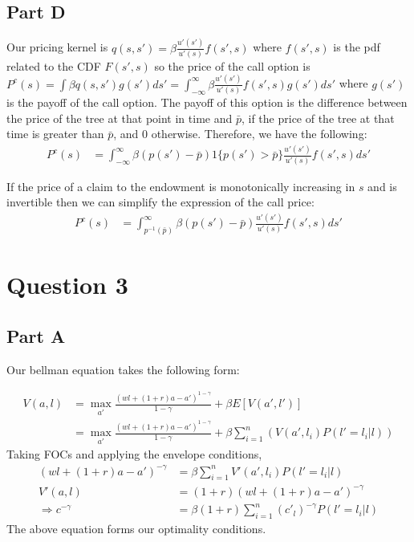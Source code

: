 \documentclass[11pt]{article} %
\begin{document}
\subsection{Part D}
Our pricing kernel is $q(s,s') = \beta \frac{u'(s')}{u'(s)} f(s',s)$ where $f(s',s) $ is the pdf related to the CDF $F(s',s)$ so the price of the call option is $P^c(s) = \int \beta q(s,s') g(s')ds' = \int_{-\infty}^{\infty}\beta \frac{u'(s')}{u'(s)} f(s',s)g(s')ds'$ where $g(s')$ is the payoff of the call option. The payoff of this option is the difference between the price of the tree at that point in time and $\bar{p}$, if the price of the tree at that time is greater than $\bar{p}$, and $0$ otherwise. Therefore, we have the following:
\begin{align*}
P^c(s) &= \int_{-\infty}^{\infty}\beta ( p(s') - \bar{p})1\{ p(s')>\bar{p}\}\frac{u'(s')}{u'(s)} f(s',s)ds'
\end{align*}

If the price of a claim to the endowment is monotonically increasing in $s$ and is invertible then we can simplify the expression of the call price:
\begin{align*}
P^c(s) &= \int_{p^{-1}(\bar{p})}^{\infty}\beta ( p(s') - \bar{p})\frac{u'(s')}{u'(s)} f(s',s)ds'
\end{align*}
\section{Question 3}
\subsection{Part A}
Our bellman equation takes the following form:

\begin{align*}
V(a,l) &= \max_{a'} \frac{(wl +(1+r)a - a')^{1-\gamma}}{1-\gamma} + \beta E[V(a',l')]\\
&=  \max_{a'} \frac{(wl +(1+r)a - a')^{1-\gamma}}{1-\gamma} + \beta \sum_{i=1}^{n} (V(a',l_i)P(l'=l_i|l) )
\end{align*}
Taking FOCs and applying the envelope conditions,
\begin{align*}
(wl +(1+r)a - a')^{-\gamma} &= \beta \sum_{i=1}^{n} V'(a',l_i)P(l'=l_i|l)\\
V'(a,l) &= (1+r)(wl +(1+r)a - a')^{-\gamma}\\
\Rightarrow c^{-\gamma} &= \beta(1+r)\sum_{i=1}^{n} (c'_l)^{-\gamma}P(l'=l_i|l)  
\end{align*}
The above equation forms our optimality conditions.
\end{document}
